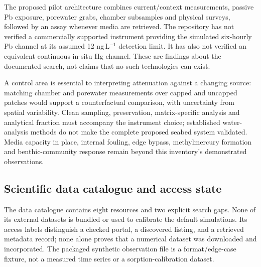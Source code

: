 The proposed pilot architecture combines current/context measurements, passive Pb exposure, porewater grabs, chamber subsamples and physical surveys, followed by an assay whenever media are retrieved. The repository has not verified a commercially supported instrument providing the simulated six-hourly Pb channel at its assumed 12 ng\,L$^{-1}$ detection limit. It has also not verified an equivalent continuous in-situ Hg channel. These are findings about the documented search, not claims that no such technologies can exist.

A control area is essential to interpreting attenuation against a changing source: matching chamber and porewater measurements over capped and uncapped patches would support a counterfactual comparison, with uncertainty from spatial variability. Clean sampling, preservation, matrix-specific analysis and analytical fraction must accompany the instrument choice; established water-analysis methods do not make the complete proposed seabed system validated.\cite{epa1631,epa2008} Media capacity in place, internal fouling, edge bypass, methylmercury formation and benthic-community response remain beyond this inventory's demonstrated observations.

\subsection{Scientific data catalogue and access state}

The data catalogue contains eight resources and two explicit search gaps. None of its external datasets is bundled or used to calibrate the default simulations. Its access labels distinguish a checked portal, a discovered listing, and a retrieved metadata record; none alone proves that a numerical dataset was downloaded and incorporated. The packaged synthetic observation file is a format/edge-case fixture, not a measured time series or a sorption-calibration dataset.\cite{repository}

